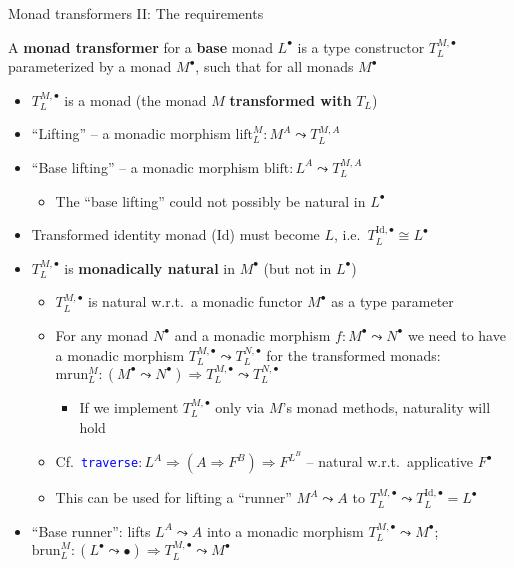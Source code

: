 \documentclass[english]{beamer}
\begin{document}
\begin{frame}{Monad transformers II: The requirements}

{\footnotesize{}\vspace{-0.25cm}}A \textbf{monad transformer} for
a \textbf{base} monad $L^{\bullet}$ is a type constructor $T_{L}^{M,\bullet}$
parameterized by a monad $M^{\bullet}$, such that for all monads
$M^{\bullet}$
\begin{itemize}
\item $T_{L}^{M,\bullet}$ is a monad (the monad $M$ \textbf{transformed
with} $T_{L}$)
\item ``Lifting'' -- a monadic morphism $\text{lift}_{L}^{M}:M^{A}\leadsto T_{L}^{M,A}$
\item ``Base lifting'' -- a monadic morphism $\text{blift}:L^{A}\leadsto T_{L}^{M,A}$
\begin{itemize}
\item The ``base lifting'' could not possibly be natural in $L^{\bullet}$
\end{itemize}
\item Transformed identity monad ($\text{Id}$) must become $L$, i.e.~$T_{L}^{\text{Id},\bullet}\cong L^{\bullet}$
\item $T_{L}^{M,\bullet}$ is \textbf{monadically natural} in $M^{\bullet}$
(but not in $L^{\bullet}$)
\begin{itemize}
\item $T_{L}^{M,\bullet}$ is natural w.r.t.~a monadic functor $M^{\bullet}$
as a type parameter
\item For any monad $N^{\bullet}$ and a monadic morphism $f:M^{\bullet}\leadsto N^{\bullet}$
we need to have a monadic morphism $T_{L}^{M,\bullet}\leadsto T_{L}^{N,\bullet}$
for the transformed monads: $\text{mrun}_{L}^{M}:\left(M^{\bullet}\leadsto N^{\bullet}\right)\Rightarrow T_{L}^{M,\bullet}\leadsto T_{L}^{N,\bullet}$
\begin{itemize}
\item If we implement $T_{L}^{M,\bullet}$ only via $M$'s monad methods,
naturality will hold 
\end{itemize}
\item Cf.~\texttt{\textcolor{blue}{\footnotesize{}traverse}}{\small{}$:L^{A}\Rightarrow\left(A\Rightarrow F^{B}\right)\Rightarrow F^{L^{B}}$
-- natural w.r.t.~applicative $F^{\bullet}$}{\small\par}
\item This can be used for lifting a ``runner'' $M^{A}\leadsto A$ to
$T_{L}^{M,\bullet}\leadsto T_{L}^{\text{Id},\bullet}=L^{\bullet}$
\end{itemize}
\item ``Base runner'': lifts $L^{A}\leadsto A$ into a monadic morphism
$T_{L}^{M,\bullet}\leadsto M^{\bullet}$; $\text{brun}_{L}^{M}:\left(L^{\bullet}\leadsto\bullet\right)\Rightarrow T_{L}^{M,\bullet}\leadsto M^{\bullet}$
\end{itemize}
\end{frame}
\end{document}
